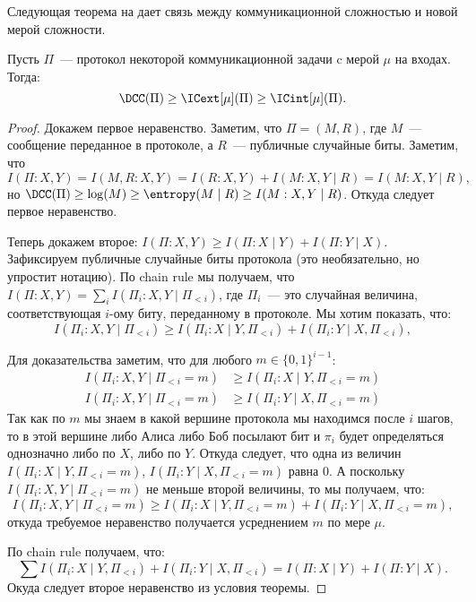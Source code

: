 Следующая теорема на дает связь между коммуникационной сложностью и новой мерой сложности.

\begin{theorem}
    Пусть $\Pi$~--- протокол некоторой коммуникационной задачи c мерой $\mu$ на входах. Тогда:
    $$
        \DCC(\Pi) \ge \ICext[\mu](\Pi) \ge \ICint[\mu](\Pi).
    $$ 
\end{theorem}

\begin{proof}
    Докажем первое неравенство. Заметим, что $\Pi = (M, R)$, где $M$~--- сообщение переданное в
    протоколе, а $R$~--- публичные случайные биты. Заметим, что
    $$
        I(\Pi : X, Y) = I(M, R : X, Y) = I(R : X, Y) + I(M : X, Y \mid R) = I(M : X, Y \mid R),
    $$
    но $\DCC(\Pi) \ge \log(M) \ge \entropy(M \mid R) \ge I(M : X, Y \mid R)$. Откуда следует первое
    неравенство.

    Теперь докажем второе: $I(\Pi : X, Y) \ge I(\Pi : X \mid Y) + I(\Pi : Y \mid X)$. Зафиксируем
    публичные случайные биты протокола (это необязательно, но упростит нотацию). По chain rule мы
    получаем, что $I(\Pi : X, Y) = \sum\limits_i I(\Pi_i : X, Y \mid \Pi_{< i})$, где $\Pi_i$~--- это
    случайная величина, соответствующая $i$-ому биту, переданному в протоколе. Мы хотим показать, что:
    $$
        I(\Pi_i : X, Y \mid \Pi_{< i}) \ge I(\Pi_i : X \mid Y, \Pi_{< i}) +
        I(\Pi_i : Y \mid X, \Pi_{< i}),
    $$

    Для доказательства заметим, что для любого $m \in \{0, 1\}^{i - 1}$:
    \begin{align*}
      I(\Pi_i : X, Y \mid \Pi_{< i} = m) &\ge I(\Pi_i : X \mid Y, \Pi_{< i} = m) \\
      I(\Pi_i : X, Y \mid \Pi_{< i} = m) &\ge I(\Pi_i : Y \mid X, \Pi_{< i} = m)
    \end{align*}
    Так как по $m$ мы знаем в какой вершине протокола мы находимся после $i$ шагов, то в этой вершине
    либо Алиса либо Боб посылают бит и $\pi_i$ будет определяться однозначно либо по $X$, либо по
    $Y$. Откуда следует, что одна из величин $I(\Pi_i : X \mid Y, \Pi_{< i} = m)$, $I(\Pi_i : Y \mid X,
    \Pi_{< i} = m)$ равна $0$. А поскольку $I(\Pi_i : X, Y \mid \Pi_{< i} = m)$ не меньше второй
    величины, то мы получаем, что:
    $$
        I(\Pi_i : X, Y \mid \Pi_{< i} = m) \ge I(\Pi_i : X \mid Y, \Pi_{< i} = m) +
        I(\Pi_i : Y \mid X, \Pi_{< i} = m),
    $$
    откуда требуемое неравенство получается усреднением $m$ по мере $\mu$.

    По chain rule получаем, что:
    $$
        \sum I(\Pi_i : X \mid Y, \Pi_{< i}) + I(\Pi_i : Y \mid X, \Pi_{< i}) =
        I(\Pi : X \mid Y) + I(\Pi : Y \mid X).
    $$ 
    Окуда следует второе неравенство из условия теоремы.
\end{proof}


